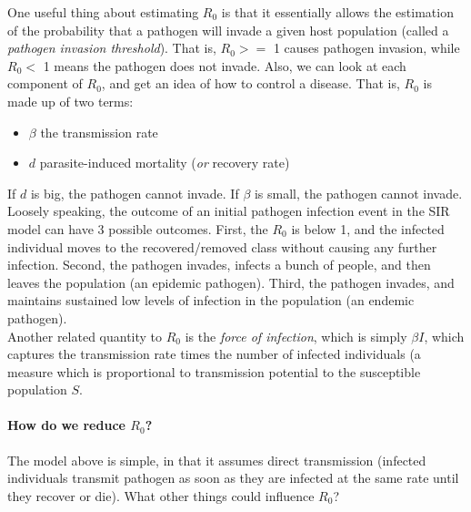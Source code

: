 \documentclass[12pt]{article}
\begin{document}
One useful thing about estimating $R_0$ is that it essentially allows the estimation of the probability that a pathogen will invade a given host population (called a \textit{pathogen invasion threshold}). That is, $R_0 >=$ 1 causes pathogen invasion, while $R_0 <$ 1 means the pathogen does not invade. Also, we can look at each component of $R_0$, and get an idea of how to control a disease. That is, $R_0$ is made up of two terms:


\begin{itemize}
  \item $\beta$ the transmission rate
  \item $d$ parasite-induced mortality (\textit{or} recovery rate)
\end{itemize}


If $d$ is big, the pathogen cannot invade. If $\beta$ is small, the pathogen cannot invade. \\


Loosely speaking, the outcome of an initial pathogen infection event in the SIR model can have 3 possible outcomes. First, the $R_0$ is below 1, and the infected individual moves to the recovered/removed class without causing any further infection. Second, the pathogen invades, infects a bunch of people, and then leaves the population (an epidemic pathogen). Third, the pathogen invades, and maintains sustained low levels of infection in the population (an endemic pathogen). \\


Another related quantity to $R_0$ is the \textit{force of infection}, which is simply $\beta I$, which captures the transmission rate times the number of infected individuals (a measure which is proportional to transmission potential to the susceptible population $S$.














\paragraph*{How do we reduce $R_0$?}

The model above is simple, in that it assumes direct transmission (infected individuals transmit pathogen as soon as they are infected at the same rate until they recover or die). What other things could influence $R_0$? \\
\end{document}
